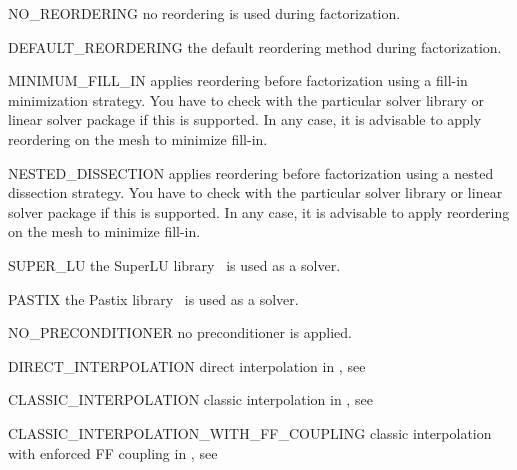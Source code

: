 \begin{memberdesc}[SolverOptions]{NO_REORDERING}
no reordering is used during factorization.
\end{memberdesc}

\begin{memberdesc}[SolverOptions]{DEFAULT_REORDERING}
the default reordering method during factorization.
\end{memberdesc}

\begin{memberdesc}[SolverOptions]{MINIMUM_FILL_IN}
applies reordering before factorization using a fill-in minimization strategy.
You have to check with the particular solver library or linear solver package
if this is supported. In any case, it is advisable to apply reordering on the
mesh to minimize fill-in.
\end{memberdesc}

\begin{memberdesc}[SolverOptions]{NESTED_DISSECTION}
applies reordering before factorization using a nested dissection strategy.
You have to check with the particular solver library or linear solver package
if this is supported. In any case, it is advisable to apply reordering on the
mesh to minimize fill-in.
\end{memberdesc}

\begin{memberdesc}[SolverOptions]{SUPER_LU}
the SuperLU library~\cite{SuperLU} is used as a solver.
\end{memberdesc}

\begin{memberdesc}[SolverOptions]{PASTIX}
the Pastix library~\cite{PASTIX} is used as a solver.
\end{memberdesc}

\begin{memberdesc}[SolverOptions]{NO_PRECONDITIONER}
no preconditioner is applied.
\end{memberdesc}

\begin{memberdesc}[SolverOptions]{DIRECT_INTERPOLATION}
direct interpolation in \AMG, see \cite{AMG}
\end{memberdesc}
\begin{memberdesc}[SolverOptions]{CLASSIC_INTERPOLATION}
classic interpolation in \AMG, see \cite{AMG}
\end{memberdesc}
\begin{memberdesc}[SolverOptions]{CLASSIC_INTERPOLATION_WITH_FF_COUPLING}
classic interpolation with enforced FF coupling in \AMG, see \cite{AMG}
\end{memberdesc}


